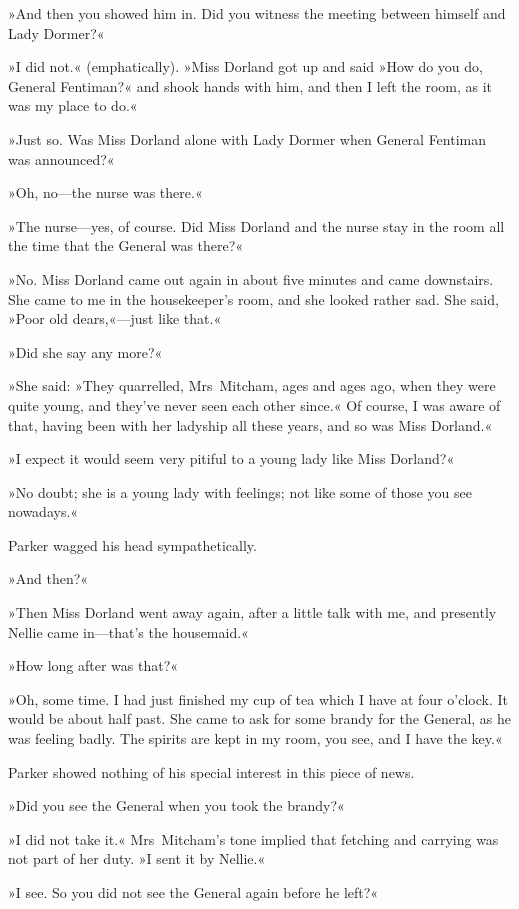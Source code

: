 »And then you showed him in. Did you witness the meeting between himself and Lady Dormer?«

»I did not.« (emphatically). »Miss Dorland got up and said »How do you do, General Fentiman?« and shook hands with him, and then I left the room, as it was my place to do.«

»Just so. Was Miss Dorland alone with Lady Dormer when General Fentiman was announced?«

»Oh, no—the nurse was there.«

»The nurse—yes, of course. Did Miss Dorland and the nurse stay in the room all the time that the General was there?«

»No. Miss Dorland came out again in about five minutes and came downstairs. She came to me in the housekeeper's room, and she looked rather sad. She said, »Poor old dears,«—just like that.«

»Did she say any more?«

»She said: »They quarrelled, Mrs~Mitcham, ages and ages ago, when they were quite young, and they've never seen each other since.« Of course, I was aware of that, having been with her ladyship all these years, and so was Miss Dorland.«

»I expect it would seem very pitiful to a young lady like Miss Dorland?«

»No doubt; she is a young lady with feelings; not like some of those you see nowadays.«

Parker wagged his head sympathetically.

»And then?«

»Then Miss Dorland went away again, after a little talk with me, and presently Nellie came in—that's the housemaid.«

»How long after was that?«

»Oh, some time. I had just finished my cup of tea which I have at four o'clock. It would be about half past. She came to ask for some brandy for the General, as he was feeling badly. The spirits are kept in my room, you see, and I have the key.«

Parker showed nothing of his special interest in this piece of news.

»Did you see the General when you took the brandy?«

»I did not take it.« Mrs~Mitcham's tone implied that fetching and carrying was not part of her duty. »I sent it by Nellie.«

»I see. So you did not see the General again before he left?«


